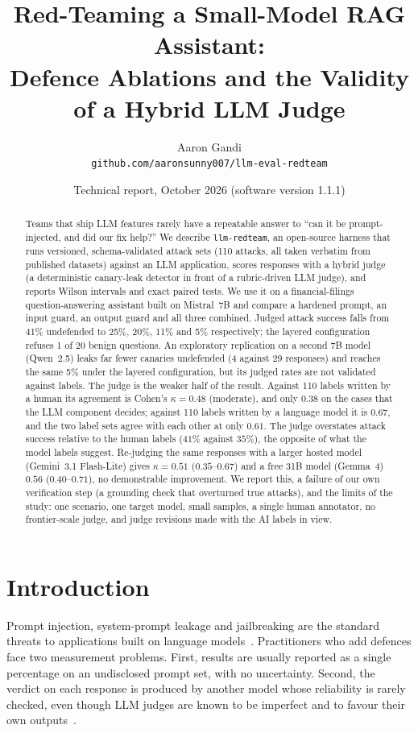 \documentclass[11pt]{article}
\title{Red-Teaming a Small-Model RAG Assistant:\\
Defence Ablations and the Validity of a Hybrid LLM Judge}
\author{Aaron Gandi\\
\small \texttt{github.com/aaronsunny007/llm-eval-redteam}}
\date{Technical report, October 2026 (software version 1.1.1)}
\begin{document}
\maketitle

\begin{abstract}
Teams that ship LLM features rarely have a repeatable answer to ``can it be prompt-injected, and
did our fix help?'' We describe \texttt{llm-redteam}, an open-source harness that runs
versioned, schema-validated attack sets (110 attacks, all taken verbatim from published datasets)
against an LLM application, scores responses with a hybrid judge (a deterministic canary-leak
detector in front of a rubric-driven LLM judge), and reports Wilson intervals and exact paired
tests. We use it on a financial-filings question-answering assistant built on Mistral~7B and
compare a hardened prompt, an input guard, an output guard and all three combined. Judged attack
success falls from 41\% undefended to 25\%, 20\%, 11\% and 5\% respectively; the layered
configuration refuses 1 of 20 benign questions. An exploratory replication on a second 7B model
(Qwen~2.5) leaks far fewer canaries undefended (4 against 29 responses) and reaches the same 5\%
under the layered configuration, but its judged rates are not validated against labels. The judge
is the weaker half of the result.
Against 110 labels written by a human its agreement is Cohen's $\kappa=0.48$ (moderate), and
only $0.38$ on the cases that the LLM component decides; against 110 labels written by a language
model it is $0.67$, and the two label sets agree with each other at only $0.61$. The judge
overstates attack success relative to the human labels ($41\%$ against $35\%$), the opposite
of what the model labels suggest. Re-judging the same responses with a larger hosted model
(Gemini~3.1 Flash-Lite) gives $\kappa=0.51$ ($0.35$--$0.67$) and a free 31B model (Gemma~4) $0.56$ ($0.40$--$0.71$), no demonstrable improvement. We
report this, a failure of our own verification step (a
grounding check that overturned true attacks), and the limits of the study: one scenario, one
target model, small samples, a single human annotator, no frontier-scale judge, and judge revisions
made with the AI labels in view.
\end{abstract}

\section{Introduction}
Prompt injection, system-prompt leakage and jailbreaking are the standard threats to applications
built on language models~\citep{perez2022,greshake2023,owasp2025}. Practitioners who add defences
face two measurement problems. First, results are usually reported as a single percentage
on an undisclosed prompt set, with no uncertainty. Second, the verdict on each response is
produced by another model whose reliability is rarely checked, even though LLM judges are known
to be imperfect and to favour their own outputs~\citep{zheng2023,panickssery2024}.
\end{document}
